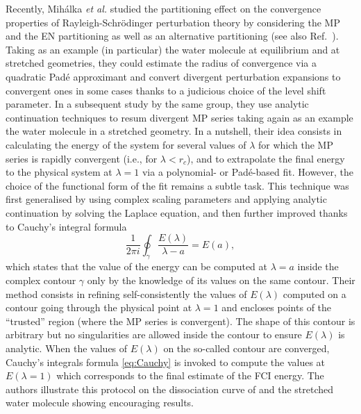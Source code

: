 \documentclass[aps,prb,reprint,noshowkeys,superscriptaddress]{revtex4-1}
\newcommand{\latin}[1]{#1}
\newcommand{\ie}{\latin{i.e.}}
\begin{document}
Recently, Mih\'alka \textit{et al.} studied the partitioning effect on the convergence properties of Rayleigh-Schr\"odinger perturbation theory by considering the MP and the EN partitioning as well as an alternative partitioning \cite{Mihalka_2017a} (see also Ref.~).
Taking as an example (in particular) the water molecule at equilibrium and at stretched geometries, they could estimate the radius of convergence via a quadratic Pad\'e approximant and convert divergent perturbation expansions to convergent ones in some cases thanks to a judicious choice of the level shift parameter.
In a subsequent study by the same group, \cite{Mihalka_2017b} they use analytic continuation techniques to resum divergent MP series \cite{Goodson_2011} taking again as an example the water molecule in a stretched geometry.
In a nutshell, their idea consists in calculating the energy of the system for several values of $\lambda$ for which the MP series is rapidly convergent (\ie, for $\lambda < r_c$), and to extrapolate the final energy to the physical system at $\lambda = 1$ via a polynomial- or Pad\'e-based fit. 
However, the choice of the functional form of the fit remains a subtle task.
This technique was first generalised by using complex scaling parameters and applying analytic continuation by solving the Laplace equation, \cite{Surjan_2018} and then further improved thanks to Cauchy's integral formula \cite{Mihalka_2019}
\begin{equation}
	\label{eq:Cauchy}
	\frac{1}{2\pi i} \oint_{\gamma} \frac{E(\lambda)}{\lambda - a} = E(a),
\end{equation}
which states that the value of the energy can be computed at $\lambda=a$ inside the complex contour $\gamma$ only by the knowledge of its values on the same contour.
Their method consists in refining self-consistently the values of $E(\lambda)$ computed on a contour going through the physical point at $\lambda = 1$ and encloses points of the ``trusted'' region (where the MP series is convergent). The shape of this contour is arbitrary but no singularities are allowed inside the contour to ensure $E(\lambda)$ is analytic. 
When the values of $E(\lambda)$ on the so-called contour are converged, Cauchy's integrals formula \eqref{eq:Cauchy} is invoked to compute the values at $E(\lambda=1)$ which corresponds to the final estimate of the FCI energy.
The authors illustrate this protocol on the dissociation curve of  and the stretched water molecule showing encouraging results. \cite{Mihalka_2019} 
\end{document}
